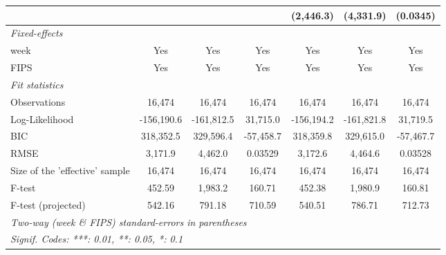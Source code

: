 \documentclass{article}
\begin{document}
\begin{landscape}
\begin{table}
\begin{tabular}{lcccccc}
    &   &    &    & (2,446.3) & (4,331.9) & (0.0345)\\
  \midrule \emph{Fixed-effects}&   &   &   &   &   &  \\
  week & Yes & Yes & Yes & Yes & Yes & Yes\\
  FIPS & Yes & Yes & Yes & Yes & Yes & Yes\\
  \midrule \emph{Fit statistics}&  & & & & & \\
  Observations & 16,474&16,474&16,474&16,474&16,474&16,474\\
  Log-Likelihood & -156,190.6&-161,812.5&31,715.0&-156,194.2&-161,821.8&31,719.5\\
  BIC & 318,352.5&329,596.4&-57,458.7&318,359.8&329,615.0&-57,467.7\\
  RMSE & 3,171.9&4,462.0&0.03529&3,172.6&4,464.6&0.03528\\
  Size of the 'effective' sample & 16,474&16,474&16,474&16,474&16,474&16,474\\
  F-test & 452.59&1,983.2&160.71&452.38&1,980.9&160.81\\
  F-test (projected) & 542.16&791.18&710.59&540.51&786.71&712.73\\
  \midrule\midrule\multicolumn{7}{l}{\emph{Two-way (week \& FIPS) standard-errors in parentheses}}\\
  \multicolumn{7}{l}{\emph{Signif. Codes: ***: 0.01, **: 0.05, *: 0.1}}\\
  \end{tabular}
\end{table}
\end{landscape}
\end{document}
